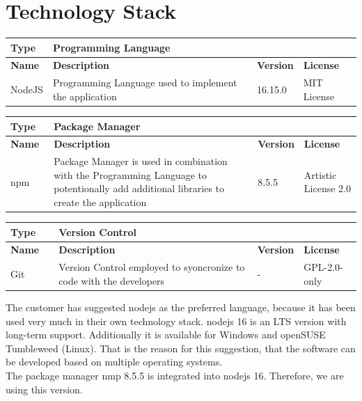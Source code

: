 \documentclass[12pt, a4paper]{article}
\begin{document}
\section{Technology Stack}
\begin{center}
\begin{tabular}{|p{1.5cm}|p{9cm}|p{1.5cm}|p{2cm}|}
\hline
\textbf{Type} & Programming Language & & \\
\hline
\textbf{Name} & \textbf{Description} & \textbf{Version} & \textbf{License}\\
\hline
NodeJS & Programming Language used to implement the application & 16.15.0 & MIT License\\
\hline
\end{tabular}\vspace{1cm}

\begin{tabular}{|p{1.5cm}|p{9cm}|p{1.5cm}|p{2cm}|}
    \hline
    \textbf{Type} & Package Manager & & \\
    \hline
    \textbf{Name} & \textbf{Description} & \textbf{Version} & \textbf{License}\\
    \hline
    npm\textcolor{white}{aaa} & Package Manager is used in combination with the Programming Language to potentionally add additional libraries to create the application & 8.5.5 & Artistic License 2.0\\
    \hline
\end{tabular}\vspace{1cm}

\begin{tabular}{|p{1.5cm}|p{9cm}|p{1.5cm}|p{2cm}|}
    \hline
    \textbf{Type} & Version Control & & \\
    \hline
    \textbf{Name} & \textbf{Description} & \textbf{Version} & \textbf{License}\\
    \hline
    Git\textcolor{white}{aaaaa} & Version Control employed to syoncronize to code with the developers  & - & GPL-2.0-only\\
    \hline
\end{tabular}
 

\end{center}

The customer has suggested nodejs as the preferred language, because it has been used very much in their own technology stack. nodejs 16 is an LTS version with long-term support. Additionally it is available for Windows and openSUSE Tumbleweed (Linux). That is the reason for this suggestion, that the software can be developed based on multiple operating systems. \\
The package manager nmp 8.5.5 is integrated into nodejs 16. Therefore, we are using this version.
\end{document}
